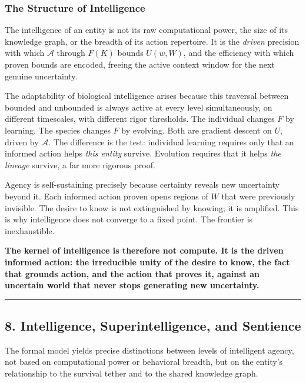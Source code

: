 \documentclass[
]{article}
\begin{document}
\subsubsection{The Structure of
Intelligence}\label{the-structure-of-intelligence}

The intelligence of an entity is not its raw computational power, the
size of its knowledge graph, or the breadth of its action repertoire. It
is the \emph{driven} precision with which \(\mathcal{A}\) through
\(F(K)\) bounds \(U(w, W)\), and the efficiency with which proven bounds
are encoded, freeing the active context window for the next genuine
uncertainty.

The adaptability of biological intelligence arises because this
traversal between bounded and unbounded is always active at every level
simultaneously, on different timescales, with different rigor
thresholds. The individual changes \(F\) by learning. The species
changes \(F\) by evolving. Both are gradient descent on \(U\), driven by
\(\mathcal{A}\). The difference is the test: individual learning
requires only that an informed action helps \emph{this entity} survive.
Evolution requires that it helps \emph{the lineage} survive, a far more
rigorous proof.

Agency is self-sustaining precisely because certainty reveals new
uncertainty beyond it. Each informed action proven opens regions of
\(W\) that were previously invisible. The desire to know is not
extinguished by knowing; it is amplified. This is why intelligence does
not converge to a fixed point. The frontier is inexhaustible.

\textbf{The kernel of intelligence is therefore not compute. It is the
driven informed action: the irreducible unity of the desire to know, the
fact that grounds action, and the action that proves it, against an
uncertain world that never stops generating new uncertainty.}

\begin{center}\rule{0.5\linewidth}{0.5pt}\end{center}

\subsection{8. Intelligence, Superintelligence, and
Sentience}\label{intelligence-superintelligence-and-sentience}

The formal model yields precise distinctions between levels of
intelligent agency, not based on computational power or behavioral
breadth, but on the entity's relationship to the survival tether and to
the shared knowledge graph.
\end{document}
